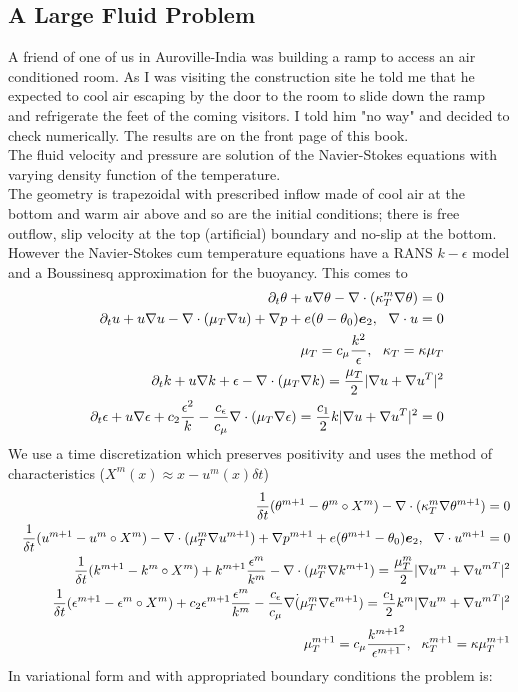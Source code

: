\documentclass[a4paper,twoside,12pt]{book}
\def\vec#1{\mbox{\boldmath $#1$}}
\def\p{\partial}
\def\n{\nabla}
\begin{document}
\subsection{A Large Fluid Problem}
A friend of one of us in Auroville-India was building a ramp to access an air conditioned room. As I was visiting the construction site he told me that he expected to cool air escaping by the door to the room to slide down the ramp and refrigerate the feet of the coming visitors.  I told him "no way" and decided to check numerically.  The results are on the front page of this book.
\\
The fluid velocity and pressure are solution of the Navier-Stokes equations with varying density function of the temperature.
\\
The geometry is trapezoidal with prescribed inflow made of cool air at the bottom and warm air above and so are the initial conditions; there is free outflow, slip velocity at the top (artificial) boundary and no-slip at the bottom.  However the Navier-Stokes cum temperature equations have a RANS $k-\epsilon$ model and a Boussinesq approximation for the buoyancy. This comes to
\begin{eqnarray}&&
\p_t\theta+u\n\theta-\n\cdot(\kappa_T^m\n\theta)=0
\cr&&
\p_t u +u\n u -\n\cdot(\mu_T\n u) +\n p+ e(\theta-\theta_0)\vec e_2,~~\n\cdot u=0
\cr&&
\mu_T = c_\mu\frac{k^2}\epsilon,~~\kappa_T=\kappa\mu_T
\cr&&
\p_t k + u\n k + \epsilon  -\n\cdot(\mu_T\n k)  = \frac{\mu_T}2|\n u+\n u^T|^2
\cr&&
\p_t\epsilon+u\n\epsilon + c_2\frac{\epsilon^2} k -\frac{c_\epsilon}{c_\mu}\n\cdot (\mu_T\n\epsilon)= \frac{c_1}2  k|\n u+\n u^T|^2=0
\end{eqnarray}
We use a time discretization which preserves positivity and uses the method of characteristics ($X^m(x)\approx  x-u^m(x)\delta t$)
\begin{eqnarray}&&
\frac 1{\delta t}(\theta^{m+1}-\theta^m \circ X^m)-\n\cdot(\kappa_T^m\n\theta^{m+1})=0
\cr&&
\frac1{\delta t}(u^{m+1}-u^m \circ X^m) -\n\cdot(\mu_T^m\n u^{m+1}) +\n p^{m+1}+ e(\theta^{m+1}-\theta_0)\vec e_2
,~~\n\cdot u^{m+1}=0
\cr&&
\frac1{\delta t}(k^{m+1}-k^m \circ X^m) + k^{m+1}\frac{\epsilon^m}{k^m}  -\n\cdot(\mu_T^m\n k^{m+1})  = \frac{\mu_T^m}2|\n u^m+{\n u^m}^T|^2
\cr&&
\frac1{\delta t}(\epsilon^{m+1}-\epsilon^m \circ X^m) + c_2\epsilon^{m+1}\frac{\epsilon^m} {k^m} -\frac{c_\epsilon}{c_\mu}\n\dot(\mu_T^m\n\epsilon^{m+1})= \frac{c_1}2  k^m|\n u^m+{\n u^m}^T|^2
\cr&&
\mu_T ^{m+1}= c_\mu\frac{{k^{m+1}}^2}{\epsilon^{m+1}},~~\kappa_T^{m+1}=\kappa\mu_T^{m+1}
\end{eqnarray}
In variational form and with appropriated boundary conditions the problem is:
\end{document}
